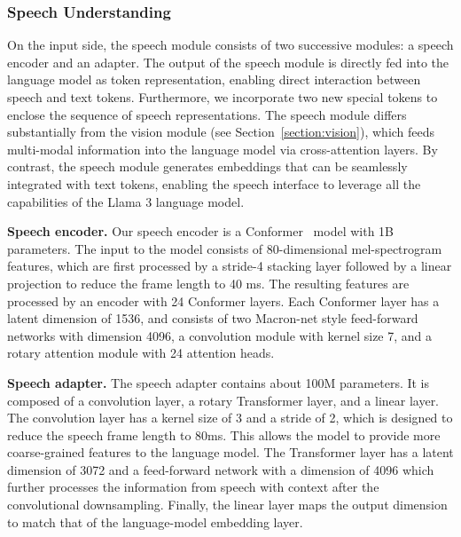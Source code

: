 \subsubsection{Speech Understanding}

On the input side, the speech module consists of two successive modules: a speech encoder and an adapter.
The output of the speech module is directly fed into the language model as token representation, enabling direct interaction between speech and text tokens.
Furthermore, we incorporate two new special tokens to enclose the sequence of speech representations.
The speech module differs substantially from the vision module (see Section~\ref{section:vision}), which feeds multi-modal information into the language model via cross-attention layers. 
By contrast, the speech module generates embeddings that can be seamlessly integrated with text tokens, enabling the speech interface to leverage all the capabilities of the Llama 3 language model.

\textbf{Speech encoder.}
Our speech encoder is a Conformer~\citep{gulati2020conformer} model with 1B parameters.
The input to the model consists of 80-dimensional mel-spectrogram features, which are first processed by a stride-4 stacking layer followed by a linear projection to reduce the frame length to 40 ms.
The resulting features are processed by an encoder with 24 Conformer layers.
Each Conformer layer has a latent dimension of 1536, and consists of two Macron-net style feed-forward networks with dimension 4096, a convolution module with kernel size 7, and a rotary attention module \citep{su2024roformer} with 24 attention heads.


\textbf{Speech adapter.}
The speech adapter contains about 100M parameters. It is composed of a convolution layer, a rotary Transformer layer, and a linear layer.
The convolution layer has a kernel size of 3 and a stride of 2, which is designed to  reduce the speech frame length to 80ms. This allows the model to provide more coarse-grained features to the language model.
The Transformer layer has a latent dimension of 3072 and a feed-forward network with a dimension of 4096 which further processes the information from speech with context after the convolutional downsampling.
Finally, the linear layer maps the output dimension to match that of the language-model embedding layer.
